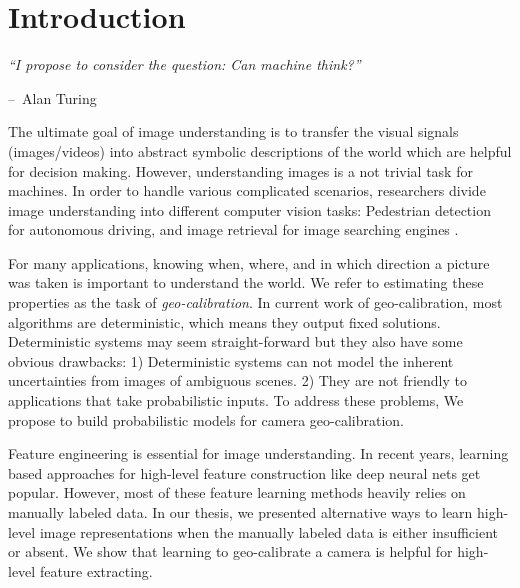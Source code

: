 \chapter{Introduction}
\label{chap:intro}

\makeatletter
\newenvironment{chapquote}[2][2em]
{\setlength{\@tempdima}{#1} \def\chapquote@author{#2} \parshape 1
  \@tempdima \dimexpr\textwidth-2\@tempdima\relax \itshape}
{\par\normalfont\hfill--\
\chapquote@author\hspace*{\@tempdima}\par\bigskip}
\makeatother

\begin{chapquote}{Alan Turing}
  ``I propose to consider the question: Can machine think?''
\end{chapquote}
The ultimate goal of image understanding is to transfer the visual
signals (images/videos) into abstract symbolic descriptions of the
world which are helpful for decision making.
However, understanding images is a not trivial task for machines.
In order to handle various complicated scenarios, researchers divide
image understanding into different computer vision tasks: Pedestrian
detection for autonomous driving, and image retrieval for image
searching engines \etc.

For many applications, knowing when, where, and in which direction a
picture was taken is important to understand the world. We refer to 
estimating these properties as the task of  {\em geo-calibration}.
In current work of geo-calibration, most algorithms are
deterministic, which means they output fixed solutions. Deterministic
systems may seem straight-forward but they also have some obvious
drawbacks: 1) Deterministic systems can not model the inherent
uncertainties from images of ambiguous scenes. 2) They are not
friendly to applications that take probabilistic inputs. To address
these problems, We propose to build probabilistic models for camera
geo-calibration.

Feature engineering is essential for image understanding. In recent
years, learning based approaches for high-level feature construction
like deep neural nets get popular. However, most of these feature
learning methods heavily relies on manually labeled data. In our
thesis, we presented alternative ways to learn high-level image
representations when the manually labeled data is either insufficient
or absent. We show that learning to geo-calibrate a camera is helpful
for high-level feature extracting.

